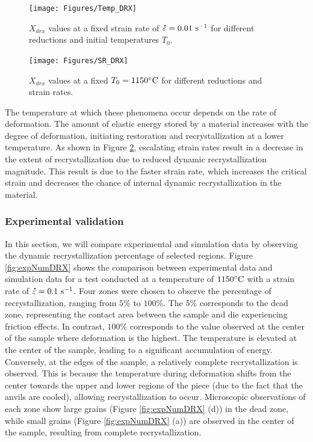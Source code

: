 \documentclass[metals,article,submit,pdftex,moreauthors]{Definitions/mdpi}
\DeclareRobustCommand{\mdot}[1]{\accentset{\mbox{\bfseries .}}{#1}}
\DeclareRobustCommand{\ps}{\text{s}^{-1}}
\begin{document}
\begin{figure}[H]
\centering
\texttt{[image: Figures/Temp\_DRX]}
\caption{$X_{drx}$ values at a fixed strain rate of $\mdot{\varepsilon}=0.01~\ps$ for different reductions and initial temperatures $T_0$.}
\label{fig:TempEffect}
\end{figure}
\begin{figure}[H]
\centering
\texttt{[image: Figures/SR\_DRX]}
\caption{$X_{drx}$ values at a fixed $T_0=1150\celsius$ for different reductions and strain rates.}
\label{fig:SREffect}
\end{figure}

The temperature at which these phenomena occur depends on the rate of deformation.
The amount of elastic energy stored by a material increases with the degree of deformation, initiating restoration and recrystallization at a lower temperature.
As shown in Figure \ref{fig:SREffect}, escalating strain rates result in a decrease in the extent of recrystallization due to reduced dynamic recrystallization magnitude.
This result is due to the faster strain rate, which increases the critical strain and decreases the chance of internal dynamic recrystallization in the material.

\subsubsection{Experimental validation \label{subsec:ExpValid}}

In this section, we will compare experimental and simulation data by observing the dynamic recrystallization percentage of selected regions.
Figure \ref{fig:expNumDRX} shows the comparison between experimental data and simulation data for a test conducted at a temperature of $1150\celsius$ with a strain rate of $\mdot{\varepsilon}=0.1~\ps$.
Four zones were chosen to observe the percentage of recrystallization, ranging from $5\%$ to $100\%$.
The $5\%$ corresponds to the dead zone, representing the contact area between the sample and die experiencing friction effects.
In contrast, $100\%$ corresponds to the value observed at the center of the sample where deformation is the highest.
The temperature is elevated at the center of the sample, leading to a significant accumulation of energy.
Conversely, at the edges of the sample, a relatively complete recrystallization is observed.
This is because the temperature during deformation shifts from the center towards the upper and lower regions of the piece (due to the fact that the anvils are cooled), allowing recrystallization to occur.
Microscopic observations of each zone show large grains (Figure \ref{fig:expNumDRX} (d)) in the dead zone, while small grains (Figure \ref{fig:expNumDRX} (a)) are observed in the center of the sample, resulting from complete recrystallization.
\end{document}
